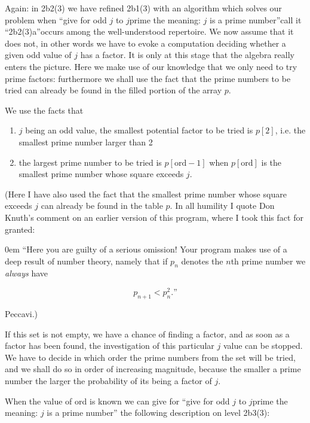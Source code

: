 Again: in 2b2(3) we have refined 2b1(3) with an algorithm which solves our problem when ``give for odd $j$ to $j$prime the meaning: $j$ is a prime number''\textemdash{}call it ``2b2(3)a''\textemdash{}occurs among the well-understood repertoire. We now assume that it does not, in other words we have to evoke a computation deciding whether a given odd value of $j$ has a factor. It is only at this stage that the algebra really enters the picture. Here we make use of our knowledge that we only need to try prime factors: furthermore we shall use the fact that the prime numbers to be tried can already be found in the filled portion of the array $p$.

We use the facts that

\begin{enumerate}[wide, nosep, label=(\arabic*)]
	\item $j$ being an odd value, the smallest potential factor to be tried is $p[2]$, i.e. the smallest prime number larger than 2

	\item the largest prime number to be tried is $p[\text{ord} - 1]$ when $p[\text{ord}]$ is the smallest prime number whose square exceeds $j$.
\end{enumerate}

(Here I have also used the fact that the smallest prime number whose square exceeds $j$ can already be found in the table $p$. In all humility I quote Don Knuth's comment on an earlier version of this program, where I took this fact for granted:

\begin{addmargin}[\parindent]{0em}
``Here you are guilty of a serious omission! Your program makes use of a deep result of number theory, namely that if $p_n$ denotes the $n$th prime number we \textit{always} have
\end{addmargin}
$$
p_{n+1}<p_n^2.\text{''}
$$

\noindent
Peccavi.)

If this set is not empty, we have a chance of finding a factor, and as soon as a factor has been found, the investigation of this particular $j$ value can be stopped. We have to decide in which order the prime numbers from the set will be tried, and we shall do so in order of increasing magnitude, because the smaller a prime number the larger the probability of its being a factor of $j$.

When the value of ord is known we can give for ``give for odd $j$ to $j$prime the meaning: $j$ is a prime number'' the following description on level 2b3(3):

